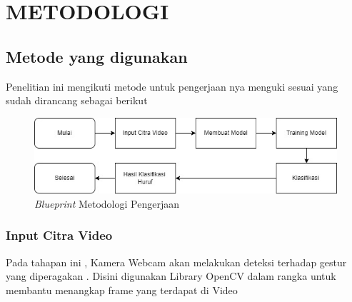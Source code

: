 \section{METODOLOGI}


\subsection{Metode yang digunakan}

Penelitian ini mengikuti metode untuk pengerjaan nya menguki sesuai yang sudah dirancang sebagai berikut

\begin{figure} [ht] \centering
  \includegraphics[scale=0.45]{gambar/Metodologi_TA.jpg}
  \caption{\emph{Blueprint} Metodologi Pengerjaan}
  \label{fig:Blueprint}
\end{figure}

\subsubsection{Input Citra Video}
Pada tahapan ini , Kamera Webcam akan melakukan deteksi terhadap gestur yang diperagakan . Disini digunakan Library OpenCV dalam rangka untuk membantu menangkap frame yang terdapat di Video 

